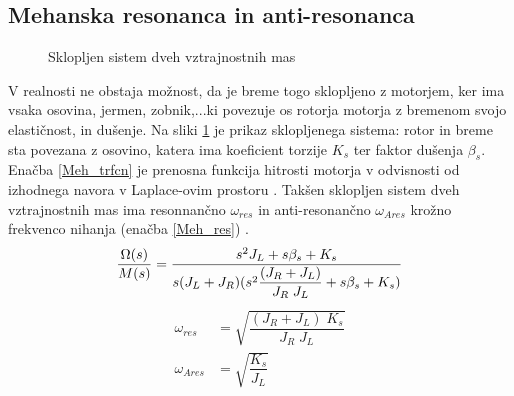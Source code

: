 \documentclass[a4paper,twoside,openright,12pt]{book}
\begin{document}
\subsection{Mehanska resonanca in anti-resonanca}
\begin{figure}[h]
	\centering
	 \caption{\label{Meh_Resonannca}Sklopljen sistem dveh vztrajnostnih mas}
\end{figure}
V realnosti ne obstaja možnost, da je breme togo sklopljeno z motorjem, ker ima vsaka osovina, jermen, zobnik,...ki povezuje os rotorja motorja z bremenom svojo elastičnost, in dušenje. Na sliki \ref{Meh_Resonannca} je prikaz sklopljenega sistema: rotor in breme sta povezana z osovino, katera ima koeficient torzije $K_s$ ter faktor dušenja $\beta_s$. Enačba \ref{Meh_trfcn} je prenosna funkcija hitrosti motorja v odvisnosti od izhodnega navora v Laplace-ovim prostoru \cite{yumrukccal2013dynamic}. Takšen sklopljen sistem dveh vztrajnostnih mas ima resonnančno $\omega_{res}$ in anti-resonančno $\omega_{Ares}$ krožno frekvenco nihanja (enačba \ref{Meh_res}) \cite{DesignTrends}.
\begin{equation} \label{Meh_trfcn}
\dfrac{\Omega(s)}{M(s)} = \dfrac{s^2J_L+s\beta_s+K_s}{s(J_L+J_R)(s^2\dfrac{(J_R+J_L)}{J_R\;J_L}+s\beta_s+K_s)}\\[5pt]
\end{equation}
\begin{equation} \label{Meh_res}
\begin{aligned}
\omega_{res} &= \sqrt{\dfrac{(J_R+J_L)\;K_s}{J_R\;J_L}}\\[5pt]
\omega_{Ares} &= \sqrt{\dfrac{K_s}{J_L}}\\[5pt]
\end{aligned}
\end{equation}
\end{document}
